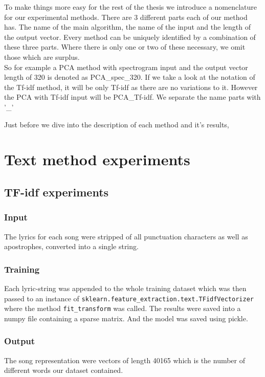 To make things more easy for the rest of the thesis we introduce a nomenclature for our experimental methods. There are 3 different parts each of our method has. The name of the main algorithm, the name of the input and the length of the output vector. Every method can be uniquely identified by a combination of these three parts. Where there is only one or two of these necessary, we omit those which are surplus.\\
So for example a PCA method with spectrogram input and the output vector length of 320 is denoted as PCA\_spec\_320. If we take a look at the notation of the Tf-idf method, it will be only Tf-idf as there are no variations to it. However the PCA with Tf-idf input will be PCA\_Tf-idf. We separate the name parts with '\_' 

Just before we dive into the description of each method and it's results, 
\section{Text method experiments}

\subsection{TF-idf experiments}\label{ssec:TF_idf}


\subsubsection{Input}
The lyrics for each song were stripped of all punctuation characters as well as apostrophes, converted into a single string. 
\subsubsection{Training}
Each lyric-string was appended to the whole training dataset which was then passed to an instance of \texttt{sklearn.feature\_extraction.text.TFidfVectorizer} where the method \texttt{fit\_transform} was called. The results were saved into a numpy file containing a sparse matrix. And the model was saved using pickle. \\

\subsubsection{Output}
The song representation were vectors of length 40165 which is the number of different words our dataset contained.

